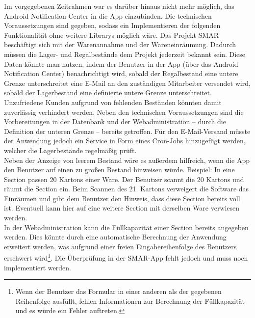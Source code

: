Im vorgegebenen Zeitrahmen war es darüber hinaus nicht mehr möglich, das Android Notification Center in die App einzubinden. Die technischen Voraussetzungen sind gegeben, sodass ein Implementieren der folgenden Funktionalität ohne weitere Librarys möglich wäre. Das Projekt \ac{SMAR} beschäftigt sich mit der Warenannahme und der Wareneinräumung. Dadurch müssen die Lager- und Regalbestände dem Projekt jederzeit bekannt sein. Diese Daten könnte man nutzen, indem der Benutzer in der App (\zB über das Android Notification Center) benachrichtigt wird, sobald der Regalbestand eine untere Grenze unterschreitet \bzw eine E-Mail an den zuständigen Mitarbeiter versendet wird, sobald der Lagerbestand eine definierte untere Grenze unterschreitet. Unzufriedene Kunden aufgrund von fehlenden Beständen könnten damit zuverlässig verhindert werden. Neben den technischen Voraussetzungen sind die Vorbereitungen in der Datenbank und der Webadministration -- durch die Definition der unteren Grenze -- bereits getroffen. Für den E-Mail-Versand müsste der Anwendung jedoch ein Service \zB in Form eines Cron-Jobs hinzugefügt werden, welcher die Lagerbestände regelmäßig prüft.\\

Neben der Anzeige von leerem Bestand wäre es außerdem hilfreich, wenn die App den Benutzer auf einen zu großen Bestand hinweisen würde.
Beispiel: In eine Section passen 20 Kartons einer Ware. Der Benutzer scannt die 20 Kartons und räumt die Section ein. Beim Scannen des 21. Kartons verweigert die Software das Einräumen und gibt dem Benutzer den Hinweis, dass diese Section bereits voll ist. Eventuell kann hier auf eine weitere Section mit derselben Ware verwiesen werden.\\
In der Webadministration kann die Füllkapazität einer Section bereits angegeben werden. Dies könnte durch eine automatische Berechnung der Anwendung erweitert werden, was aufgrund einer freien Eingabereihenfolge des Benutzers erschwert wird\footnote{Wenn der Benutzer das Formular in einer anderen als der gegebenen Reihenfolge ausfüllt, fehlen Informationen zur Berechnung der Füllkapazität und es würde ein Fehler auftreten.}. Die Überprüfung in der \ac{SMAR}-App fehlt jedoch und muss noch implementiert werden.\\

